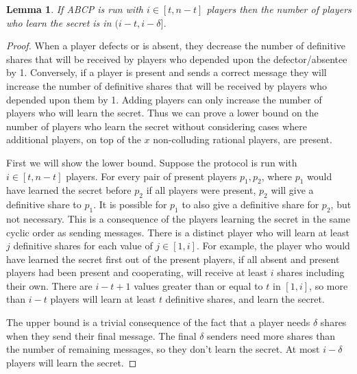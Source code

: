 \documentclass{dalcsthesis}
\newtheorem{lemma}{Lemma}
\begin{document}
\begin{lemma}If ABCP is run with $i \in [t,n-t]$ players then the number of players who learn the secret is in $(i-t, i-\delta]$. \label{Lem:ABCP:SomeDeltaLose} \end{lemma}
\begin{proof}
When a player defects or is absent, they decrease the number of definitive shares that will be received by players who depended upon the defector/absentee by 1. Conversely, if a player is present and sends a correct message they will increase the number of definitive shares that will be received by players who depended upon them by 1. Adding players can only increase the number of players who will learn the secret. Thus we can prove a lower bound on the number of players who learn the secret without considering cases where additional players, on top of the $x$ non-colluding rational players, are present.

First we will show the lower bound. Suppose the protocol is run with $i \in [t,n-t]$ players. For every pair of present players $p_1, p_2$, where $p_1$ would have learned the secret before $p_2$ if all players were present, $p_2$ will give a definitive share to $p_1$. It is possible for $p_1$ to also give a definitive share for $p_2$, but not necessary. This is a consequence of the players learning the secret in the same cyclic order as sending messages. There is a distinct player who will learn at least $j$ definitive shares for each value of $j \in [1, i]$. For example, the player who would have learned the secret first out of the present players, if all absent and present players had been present and cooperating, will receive at least $i$ shares including their own. There are $i-t+1$ values greater than or equal to $t$ in $[1,i]$, so more than $i-t$ players will learn at least $t$ definitive shares, and learn the secret.

The upper bound is a trivial consequence of the fact that a player needs $\delta$ shares when they send their final message. The final $\delta$ senders need more shares than the number of remaining messages, so they don't learn the secret. At most $i-\delta$ players will learn the secret.  
\end{proof}
\end{document}
